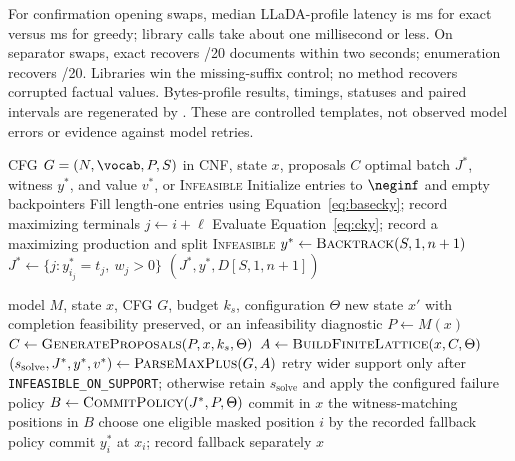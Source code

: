 

For confirmation opening swaps, median LLaDA-profile latency is \MRepairConfirmOpeningExactMs{} ms for exact versus \MRepairConfirmOpeningGreedyMs{} ms for greedy; library calls take about one millisecond or less. On separator swaps, exact recovers \MRepairConfirmSeparatorExact{}/20 documents within two seconds; enumeration recovers \MRepairConfirmSeparatorEnumeration{}/20. Libraries win the missing-suffix control; no method recovers corrupted factual values. Bytes-profile results, timings, statuses and paired intervals are regenerated by . These are controlled templates, not observed model errors or evidence against model retries.

\begin{algorithm}[ht]
\caption{Token-aligned MWPC through max-plus CKY}
\label{alg:cky}
\small
\footnotesize
\begin{algorithmic}[1]
\Require CFG $G=(N,\vocab,P,S)$ in CNF, state $x$, proposals $C$
\Ensure optimal batch $J^*$, witness $y^*$, and value $v^*$, or \textsc{Infeasible}
\State Initialize entries to $\neginf$ and empty backpointers
\State Fill length-one entries using Equation~\ref{eq:basecky}; record maximizing terminals
  \State $j\gets i+\ell$
  \State Evaluate Equation~\ref{eq:cky}; record a maximizing production and split
\EndFor
{} \Return \textsc{Infeasible} \EndIf
\State $y^*\gets\textsc{Backtrack}(S,1,n+1)$
\State $J^*\gets\{j:y^*_{i_j}=t_j,\ w_j>0\}$
\State \Return $(J^*,y^*,D[S,1,n+1])$
\end{algorithmic}
\end{algorithm}

\begin{algorithm}[ht]
\caption{Exact parallel-commitment step}
\label{alg:step}
\small
\footnotesize
\begin{algorithmic}[1]
\Require model $M$, state $x$, CFG $G$, budget $k_s$, configuration $\Theta$
\Ensure new state $x'$ with completion feasibility preserved, or an infeasibility diagnostic
\State $P\gets M(x)$ 
\State $C\gets\textsc{GenerateProposals}(P,x,k_s,\Theta)$
\State $A\gets\textsc{BuildFiniteLattice}(x,C,\Theta)$
\State $(s_{\mathrm{solve}},J^*,y^*,v^*)\gets\textsc{ParseMaxPlus}(G,A)$
  \State retry wider support only after \texttt{INFEASIBLE\_ON\_SUPPORT}; otherwise retain $s_{\mathrm{solve}}$ and apply the configured failure policy
\Else
  \State $B\gets\textsc{CommitPolicy}(J^*,P,\Theta)$
    \State commit in $x$ the witness-matching positions in $B$
  \Else
    \State choose one eligible masked position $i$ by the recorded fallback policy
    \State commit $y^*_i$ at $x_i$; record fallback separately
  \EndIf
\EndIf
\State \Return $x$
\end{algorithmic}
\end{algorithm}
